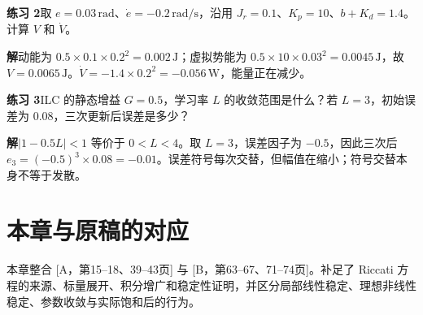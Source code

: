 \textbf{练习 2}\quad 取 $e=0.03\,\mathrm{rad}$、$\dot e=-0.2\,\mathrm{rad/s}$，沿用 $J_r=0.1$、$K_p=10$、$b+K_d=1.4$。计算 $V$ 和 $\dot V$。

\textbf{解}\quad 动能为 $0.5\times0.1\times0.2^2=0.002\,\mathrm{J}$；虚拟势能为 $0.5\times10\times0.03^2=0.0045\,\mathrm{J}$，故 $V=0.0065\,\mathrm{J}$。$\dot V=-1.4\times0.2^2=-0.056\,\mathrm{W}$，能量正在减少。

\textbf{练习 3}\quad ILC 的静态增益 $G=0.5$，学习率 $L$ 的收敛范围是什么？若 $L=3$，初始误差为 0.08，三次更新后误差是多少？

\textbf{解}\quad $|1-0.5L|<1$ 等价于 $0<L<4$。取 $L=3$，误差因子为 $-0.5$，因此三次后 $e_3=(-0.5)^3\times0.08=-0.01$。误差符号每次交替，但幅值在缩小；符号交替本身不等于发散。

\section*{本章与原稿的对应}
本章整合 [A，第15--18、39--43页] 与 [B，第63--67、71--74页]。补足了 Riccati 方程的来源、标量展开、积分增广和稳定性证明，并区分局部线性稳定、理想非线性稳定、参数收敛与实际饱和后的行为。
